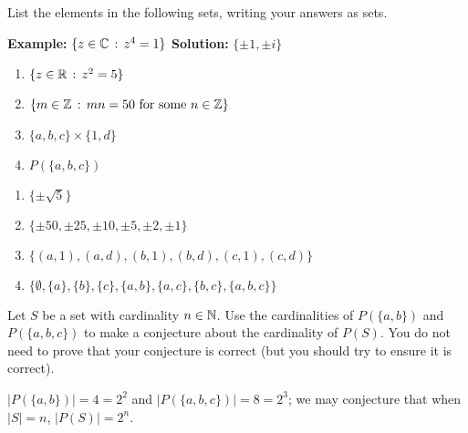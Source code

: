 \begin{exercise}[ID=1B]
List the elements in the following sets, writing your answers as sets.

\medskip
\textbf{Example:} $\{z\in \mathbb{C}\,:\,z^4=1\}$  \quad \textbf{Solution:} $\{\pm 1, \pm i\}$
\medskip

\begin{enumerate}

\item $\{z\in \mathbb{R}\,:\, z^2=5\}$

\item $\{m \in \mathbb{Z}\,:\, mn=50 \mbox{ for some }n\in \mathbb{Z}\}$

\item $\{a,b,c\}\times \{1,d\}$

\item $P(\{a,b,c\})$
\end{enumerate}

\end{exercise}

\begin{solution}[print=false]
\begin{enumerate}
\item $\{\pm\sqrt{5}\}$
\item $\{\pm 50, \pm 25, \pm 10, \pm 5, \pm 2, \pm 1\}$
\item $\{(a,1),(a,d), (b,1),(b,d),(c,1),(c,d)\}$
\item $\{\emptyset, \{a\}, \{b\},
    \{c\},\{a,b\},\{a,c\},\{b,c\}, \{a,b,c\}\}$
\end{enumerate}
\end{solution}

\begin{exercise}[ID=1C]
Let $S$ be a set with cardinality $n\in \mathbb{N}$. Use the cardinalities of $P(\{a,b\})$ and $P(\{a,b,c\})$ to make a conjecture about the cardinality of $P(S)$. You do not need to prove that your conjecture is correct (but you should try to ensure it is correct).

\end{exercise}

\begin{solution}[print=false]
$|P(\{a,b\})|=4=2^2$ and $|P(\{a,b,c\})|=8=2^3$; we may conjecture that when $|S|=n$, $|P(S)|=2^n$.

\end{solution}

